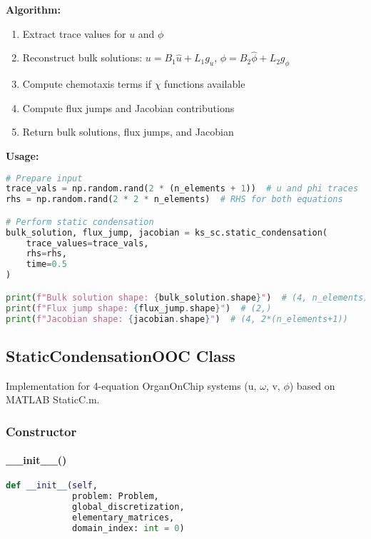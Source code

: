 \textbf{Algorithm:} 
\begin{enumerate}
    \item Extract trace values for $u$ and $\phi$
    \item Reconstruct bulk solutions: $u = B_1 \hat{u} + L_1 g_u$, $\phi = B_2 \hat{\phi} + L_2 g_\phi$
    \item Compute chemotaxis terms if $\chi$ functions available
    \item Compute flux jumps and Jacobian contributions
    \item Return bulk solutions, flux jumps, and Jacobian
\end{enumerate}

\textbf{Usage:}
\begin{lstlisting}[language=Python, caption=KellerSegel Static Condensation Usage]
# Prepare input
trace_vals = np.random.rand(2 * (n_elements + 1))  # u and phi traces
rhs = np.random.rand(2 * 2 * n_elements)  # RHS for both equations

# Perform static condensation
bulk_solution, flux_jump, jacobian = ks_sc.static_condensation(
    trace_values=trace_vals,
    rhs=rhs,
    time=0.5
)

print(f"Bulk solution shape: {bulk_solution.shape}")  # (4, n_elements)
print(f"Flux jump shape: {flux_jump.shape}")  # (2,)
print(f"Jacobian shape: {jacobian.shape}")  # (4, 2*(n_elements+1))
\end{lstlisting}


\subsection{StaticCondensationOOC Class}
\label{subsec:static_condensation_ooc}

Implementation for 4-equation OrganOnChip systems (u, $\omega$, v, $\phi$) based on MATLAB StaticC.m.

\subsubsection{Constructor}

\paragraph{\_\_init\_\_()}\leavevmode
\begin{lstlisting}[language=Python, caption=StaticCondensationOOC Constructor]
def __init__(self, 
             problem: Problem, 
             global_discretization, 
             elementary_matrices, 
             domain_index: int = 0)
\end{lstlisting}

